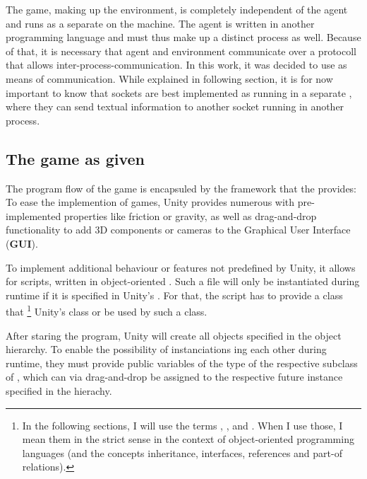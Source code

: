 \noindent The game, making up the environment, is completely independent of the agent and runs as a separate  on the machine. The agent is written in another programming language and must thus make up a distinct process as well. Because of that, it is necessary that agent and environment communicate over a protocoll that allows inter-process-communication. In this work, it was decided to use  as means of communication. While explained in following section, it is for now important to know that sockets are best implemented as running in a separate , where they can send textual information to another socket running in another process.

\subsection{The game as given}
\label{ch:gamedescription}

The program flow of the game is encapsuled by the framework that the  provides: To ease the implemention of games, Unity provides numerous  with pre-implemented properties like friction or gravity, as well as drag-and-drop functionality to add 3D components or cameras to the Graphical User Interface (\textbf{GUI}).

To implement additional behaviour or features not predefined by Unity, it allows for scripts, written in object-oriented . Such a file will only be instantiated during runtime if it is specified in Unity's . For that, the script has to provide a class that \footnote{In the following sections, I will use the terms , ,  and . When I use those, I mean them in the strict sense in the context of object-oriented programming languages (and the concepts inheritance, interfaces, references and part-of relations).} Unity's class  or be used by such a class.

After staring the program, Unity will create all objects specified in the object hierarchy. To enable the possibility of instanciations ing each other during runtime, they must provide public variables of the type of the respective subclass of , which can via drag-and-drop be assigned to the respective future instance specified in the hierachy. 

